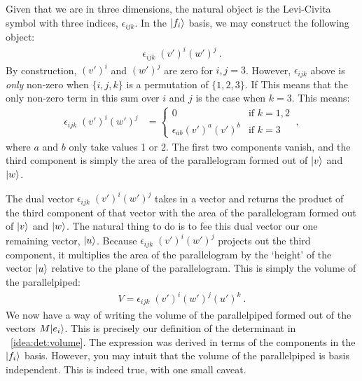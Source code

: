 \documentclass[12pt, oneside]{report}    %
\begin{document}
Given that we are in three dimensions, the natural object is the Levi-Civita symbol with three indices, $\epsilon_{ijk}$. In the $\left|f_{i}\right\rangle$ basis, we may construct the following object:
\begin{align}
    \epsilon_{ijk}\;(v')^i(w')^j \ .
\end{align}
By construction, $(v')^i$ and $(w')^j$ are zero for $i,j=3$. However, $\epsilon_{ijk}$ above is \emph{only} non-zero when $\{i,j,k\}$ is a permutation of $\{1,2,3\}$. If This means that the only non-zero term in this sum over $i$ and $j$ is the case when $k=3$. This means:
\begin{align}
    \epsilon_{ijk}\;(v')^i(w')^j
    &=
    \begin{cases}
    0 &\text{if } k = 1,2\\
    \epsilon_{ab}(v')^a (v')^b &\text{if } k = 3
    \end{cases} \ ,
    \label{eq:det:eps:v:w}
\end{align}
where $a$ and $b$ only take values 1 or 2. The first two components vanish, and the third component is simply the area of the parallelogram formed out of $\left|v\right\rangle$ and $\left|w\right\rangle$. 

The dual vector $\epsilon_{ijk}\;(v')^i(w')^j$ takes in a vector and returns the product of the third component of that vector with the area of the parallelogram formed out of $\left|v\right\rangle$ and $\left|w\right\rangle$. The natural thing to do is to fee this dual vector our one remaining vector, $\left|u\right\rangle$. Because $\epsilon_{ijk}\;(v')^i(w')^j$ projects out the third component, it multiplies the area of the parallelogram by the `height' of the vector $\left|u\right\rangle$ relative to the plane of the parallelogram. This is simply the volume of the parallelpiped:
\begin{align}
    V = \epsilon_{ijk}\;(v')^i(w')^j(u')^k \ .
\end{align}
We now have a way of writing the volume of the parallelpiped formed out of the vectors $M{\left|e_i\right\rangle}$. This is precisely our definition of the determinant in \bigidearef{}~\ref{idea:det:volume}. The expression was derived in terms of the components in the $\left|f_i\right\rangle$ basis. However, you may intuit that the volume of the parallelpiped is basis independent. This is indeed true, with one small caveat.
\end{document}
